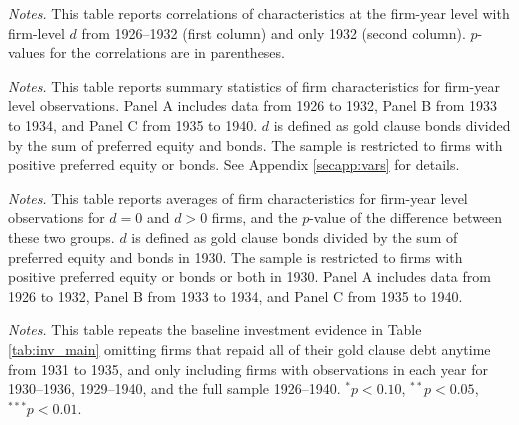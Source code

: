 \begin{table}[p]\centering
\caption{\\ Correlations of firm characteristics with $d$}\scriptsize
\label{tabapp:corr}  


\vspace*{3mm} \justifying \noindent
\scriptsize{\textit{Notes.} This table reports correlations of characteristics at the firm-year level with firm-level $d$ from 1926--1932 (first column) and only 1932 (second column). $p$-values for the correlations are in parentheses. }
\end{table}

\begin{table}[p]\centering
\caption{\\ Summary statistics for preferred equity and bond issuers}\scriptsize
\label{tabapp:sumpos}
  


\vspace*{3mm} \justifying \noindent
\scriptsize{\textit{Notes.} This table reports summary statistics of firm characteristics for firm-year level observations. Panel A includes data from 1926 to 1932, Panel B from 1933 to 1934, and Panel C from 1935 to 1940. $d$ is defined as gold clause bonds divided by the sum of preferred equity and bonds. The sample is restricted to firms with positive preferred equity or bonds. See Appendix \ref{secapp:vars} for details.}
\end{table}

\begin{table}[p]\centering
\caption{\\ Average characteristics for $d = 0$ and $d > 0$ firms among preferred equity and bond issuers}\scriptsize
\label{tab:sum_diff_pos}  


\vspace*{3mm} \justifying \noindent
\scriptsize{\textit{Notes.} This table reports averages of firm characteristics for firm-year level observations for $d = 0$ and $d > 0$ firms, and the $p$-value of the difference between these two groups. $d$ is defined as gold clause bonds divided by the sum of preferred equity and bonds in 1930. The sample is restricted to firms with positive preferred equity or bonds or both in 1930. Panel A includes data from 1926 to 1932, Panel B from 1933 to 1934, and Panel C from 1935 to 1940. }
\end{table}

\begin{table}[p]\centering
\caption{\\ Omitting repayers and balanced panels}\scriptsize \renewcommand{\arraystretch}{1.2}
\label{tabapp:repay}
  


\vspace*{3mm} \justifying \noindent
\scriptsize{\textit{Notes.}  This table repeats the baseline investment evidence in Table \ref{tab:inv_main} omitting firms that repaid all of their gold clause debt anytime from 1931 to 1935, and only including firms with observations in each year for 1930--1936, 1929--1940, and the full sample 1926--1940. 
$^{*}p<0.10$, $^{**}p<0.05$, $^{***}p<0.01$. }
\end{table}

